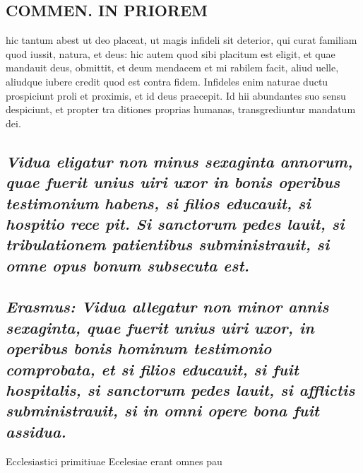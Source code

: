 \documentclass{article}
\begin{document}
\begin{pages}
\section*{COMMEN. IN PRIOREM }
\marginpar{[ p.122 ]}\pstart hic tantum abest ut deo placeat, ut magis infideli sit deterior, qui curat familiam quod iussit, natura, et deus: hic autem quod sibi placitum est eligit, et quae mandauit deus, obmittit, et deum mendacem et mi rabilem facit, aliud uelle, aliudque iubere credit quod est contra fidem. Infideles enim naturae ductu prospiciunt proli et proximis, et id deus praecepit. Id hii abundantes suo sensu despiciunt, et propter tra ditiones proprias humanas, transgrediuntur mandatum dei.  \pend
{}
{}
\subsection*{\textit{Vidua eligatur non minus sexaginta annorum, quae fuerit unius uiri uxor in bonis operibus testimonium habens, si filios educauit, si hospitio rece pit. Si sanctorum pedes lauit, si tribulationem patientibus subministrauit, si omne opus bonum subsecuta est. }}
{}
\subsection*{\textit{Erasmus: Vidua allegatur non minor annis sexaginta, quae fuerit unius uiri uxor, in operibus bonis hominum testimonio comprobata, et si filios educauit, si fuit hospitalis, si sanctorum pedes lauit, si afflictis subministrauit, si in omni opere bona fuit assidua. }}\pstart Ecclesiastici primitiuae Ecelesiae erant omnes pau\pend

\end{pages}
\end{document}
